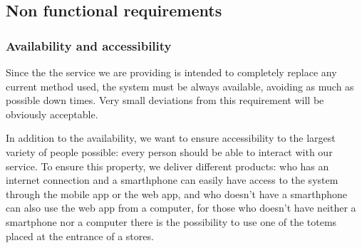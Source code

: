 %
%
\subsection{Non functional requirements}
\label{subsect:softwaresystemattributes}

\subsubsection{Availability and accessibility}
\label{subsubsect:availabilityandaccessibility}

Since the the service we are providing is intended to completely replace any current method used, the system must be always available, avoiding as much as possible down times. Very small deviations from this requirement will be obviously acceptable.

In addition to the availability, we want to ensure accessibility to the largest variety of people possible: every person should be able to interact with our service. To ensure this property, we deliver different products: who has an internet connection and a smarthphone can easily have access to the system through the mobile app or the web app, and who doesn't have a smarthphone can also use the web app from a computer, for those who doesn't have neither a smartphone nor a computer there is the possibility to use one of the totems placed at the entrance of a stores.

